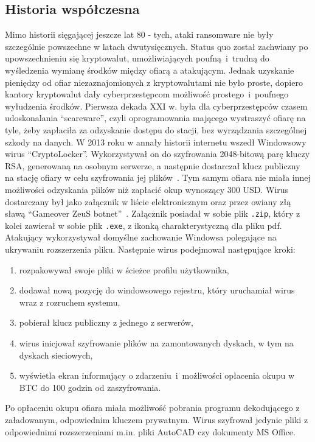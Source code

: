 \subsection{Historia współczesna}
Mimo historii sięgającej jeszcze lat 80 - tych, ataki ransomware nie były szczególnie powszechne w latach dwutysięcznych. Status quo został zachwiany po upowszechnieniu się kryptowalut, umożliwiających poufną~i~trudną do wyśledzenia wymianę środków między ofiarą a atakującym. Jednak uzyskanie pieniędzy od ofiar niezaznajomionych z kryptowalutami nie było proste, dopiero kantory kryptowalut dały cyberprzestępcom możliwość prostego~i~poufnego wyłudzenia środków. Pierwsza dekada XXI w. była dla cyberprzestępców czasem udoskonalania \foreignquote{english}{scareware}, czyli oprogramowania mającego wystraszyć ofiarę na tyle, żeby zapłaciła za odzyskanie dostępu do stacji, bez wyrządzania szczególnej szkody na danych. 
\newline
W 2013 roku w annały historii internetu wszedł Windowsowy wirus \foreignquote{english}{CryptoLocker}. Wykorzystywał on do szyfrowania 2048-bitową parę kluczy RSA, generowaną na osobnym serwerze, a następnie dostarczał klucz publiczny na stację ofiary w celu szyfrowania jej plików~\cite{cryptolockerfaq}. Tym samym ofiara nie miała innej możliwości odzyskania plików niż zapłacić okup wynoszący 300 USD. Wirus dostarczany był jako załącznik w liście elektronicznym oraz przez owiany złą sławą \foreignquote{english}{Gameover ZeuS botnet}~\cite{zeusbot}. Załącznik posiadał w sobie plik \texttt{.zip}, który z kolei zawierał w sobie plik \texttt{.exe}, z ikonką charakterystyczną dla pliku pdf. Atakujący wykorzystywał domyślne zachowanie Windowsa polegające na ukrywaniu rozszerzenia pliku. Następnie wirus podejmował następujące kroki:
\begin{enumerate}
    \item rozpakowywał swoje pliki w ścieżce profilu użytkownika,
    \item dodawał nową pozycję do windowsowego rejestru, który uruchamiał wirus wraz z rozruchem systemu,
    \item pobierał klucz publiczny z jednego z serwerów,
    \item wirus inicjował szyfrowanie plików na zamontowanych dyskach, w tym na dyskach sieciowych,
    \item wyświetla ekran informujący o zdarzeniu~i~możliwości opłacenia okupu w BTC do 100 godzin od zaszyfrowania.
\end{enumerate}
Po opłaceniu okupu ofiara miała możliwość pobrania programu dekodującego z załadowanym, odpowiednim kluczem prywatnym. Wirus szyfrował jedynie pliki z odpowiednimi rozszerzeniami m.in. pliki AutoCAD czy dokumenty MS Office.
